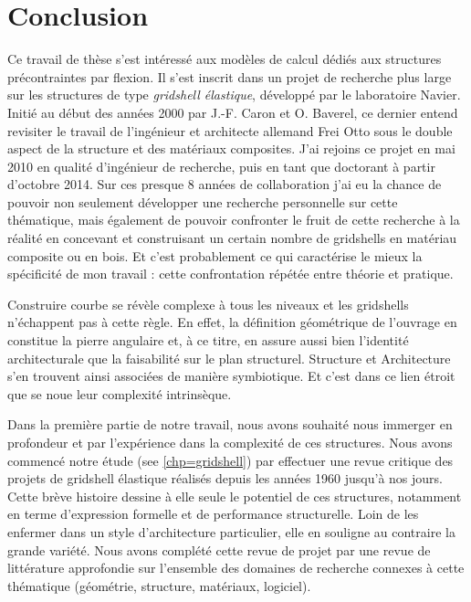 
\newrefsegment
\chapter*{Conclusion}\label{chp=conclu}

Ce travail de thèse s'est intéressé aux modèles de calcul dédiés aux structures précontraintes par flexion. Il s'est inscrit dans un projet de recherche plus large sur les structures de type \emph{gridshell élastique}, développé par le laboratoire Navier. Initié au début des années 2000 par J.-F. Caron et O. Baverel, ce dernier entend revisiter le travail de l'ingénieur et architecte allemand Frei Otto sous le double aspect de la structure et des matériaux composites. J’ai rejoins ce projet en mai 2010 en qualité d’ingénieur de recherche, puis en tant que doctorant à partir d’octobre 2014. Sur ces presque 8 années de collaboration j’ai eu la chance de pouvoir non seulement développer une recherche personnelle sur cette thématique, mais également de pouvoir confronter le fruit de cette recherche à la réalité en concevant et construisant un certain nombre de gridshells en matériau composite ou en bois. Et c’est probablement ce qui caractérise le mieux la spécificité de mon travail : cette confrontation répétée entre théorie et pratique.

Construire courbe se révèle complexe à tous les niveaux et les gridshells n’échappent pas à cette règle. En effet, la définition géométrique de l’ouvrage en constitue la pierre angulaire et, à ce titre, en assure aussi bien l’identité architecturale que la faisabilité sur le plan structurel. Structure et Architecture s’en trouvent ainsi associées de manière symbiotique. Et c’est dans ce lien étroit que se noue leur complexité intrinsèque.

Dans la première partie de notre travail, nous avons souhaité nous immerger en profondeur et par l’expérience dans la complexité de ces structures. Nous avons commencé notre étude (see \cref{chp=gridshell}) par effectuer une revue critique des projets de gridshell élastique réalisés depuis les années 1960 jusqu’à nos jours. Cette brève histoire dessine à elle seule le potentiel de ces structures, notamment en terme d’expression formelle et de performance structurelle. Loin de les enfermer dans un style d’architecture particulier, elle en souligne au contraire la grande variété. Nous avons complété cette revue de projet par une revue de littérature approfondie sur l’ensemble des domaines de recherche connexes à cette thématique (géométrie, structure, matériaux, logiciel).

